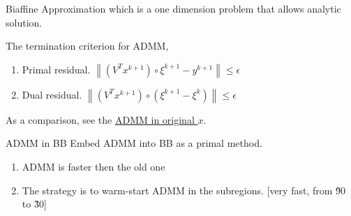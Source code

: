 \documentclass[aspectratio=1610, 9pt]{beamer}
\begin{document}
\begin{frame}[allowframebreaks]{Biaffine Approximation}
  which is a one dimension problem that allows analytic solution.

  \begin{theorem}
    The termination criterion for ADMM,
    \begin{enumerate}
      \item Primal residual. \(\left \|(V^Tx^{k+1}) \circ \xi^{k+1} - y^{k+1} \right\| \le \epsilon\)
      \item Dual residual. \(\left\|(V^Tx^{k+1}) \circ (\xi^{k+1}-\xi^k)\right\| \le \epsilon\)
    \end{enumerate}
  \end{theorem}
  As a comparison, see the \hyperlink{oldad}{ADMM in original \(x\)}.
\end{frame}

\begin{frame}[allowframebreaks]{ADMM in BB}
  Embed ADMM into BB as a primal method.

  \begin{enumerate}
    \item ADMM is faster then the old one
    \item The strategy is to warm-start ADMM in the subregions. [very fast, from \~90 to \~30]
  \end{enumerate}

\end{frame}
\end{document}
